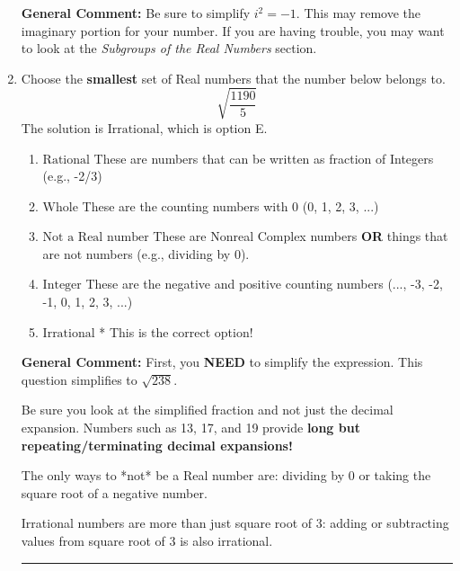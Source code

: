 \documentclass{extbook}[14pt]
\newcommand{\litem}[1]{\item #1

\rule{\textwidth}{0.4pt}}
\begin{document}
\begin{enumerate}
{\textbf{General Comment:} Be sure to simplify $i^2 = -1$. This may remove the imaginary portion for your number. If you are having trouble, you may want to look at the \textit{Subgroups of the Real Numbers} section.
}
\litem{
Choose the \textbf{smallest} set of Real numbers that the number below belongs to.
\[ \sqrt{\frac{1190}{5}} \]
The solution is \( \text{Irrational} \), which is option E.\begin{enumerate}[label=\Alph*.]
\item \( \text{Rational} \)
These are numbers that can be written as fraction of Integers (e.g., -2/3)
\item \( \text{Whole} \)
These are the counting numbers with 0 (0, 1, 2, 3, ...)
\item \( \text{Not a Real number} \)
These are Nonreal Complex numbers \textbf{OR} things that are not numbers (e.g., dividing by 0).
\item \( \text{Integer} \)
These are the negative and positive counting numbers (..., -3, -2, -1, 0, 1, 2, 3, ...)
\item \( \text{Irrational} \)
* This is the correct option!
\end{enumerate}

\textbf{General Comment:} First, you \textbf{NEED} to simplify the expression. This question simplifies to $\sqrt{238}$. 
 
 Be sure you look at the simplified fraction and not just the decimal expansion. Numbers such as 13, 17, and 19 provide \textbf{long but repeating/terminating decimal expansions!} 
 
 The only ways to *not* be a Real number are: dividing by 0 or taking the square root of a negative number. 
 
 Irrational numbers are more than just square root of 3: adding or subtracting values from square root of 3 is also irrational.
}
\end{enumerate}
\end{document}
